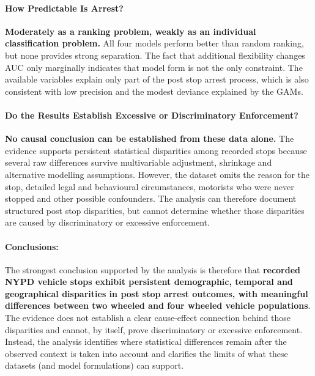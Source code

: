 \paragraph{How Predictable Is Arrest?}

\textbf{Moderately as a ranking problem, weakly as an individual classification problem.} All four models perform better than random ranking, but none provides strong separation. The fact that additional flexibility changes AUC only marginally indicates that model form is not the only constraint. The available variables explain only part of the post stop arrest process, which is also consistent with low precision and the modest deviance explained by the GAMs.

\paragraph{Do the Results Establish Excessive or Discriminatory Enforcement?}

\textbf{No causal conclusion can be established from these data alone.} The evidence supports persistent statistical disparities among recorded stops because several raw differences survive multivariable adjustment, shrinkage and alternative modelling assumptions. However, the dataset omits the reason for the stop, detailed legal and behavioural circumstances, motorists who were never stopped and other possible confounders. The analysis can therefore document structured post stop disparities, but cannot determine whether those disparities are caused by discriminatory or excessive enforcement.

\paragraph{Conclusions:} The strongest conclusion supported by the analysis is therefore that \textbf{recorded NYPD vehicle stops exhibit persistent demographic, temporal and geographical disparities in post stop arrest outcomes, with meaningful differences between two wheeled and four wheeled vehicle populations}. The evidence does not establish a clear cause-effect connection behind those disparities and cannot, by itself, prove discriminatory or excessive enforcement. Instead, the analysis identifies where statistical differences remain after the observed context is taken into account and clarifies the limits of what these datasets (and model formulations) can support.
